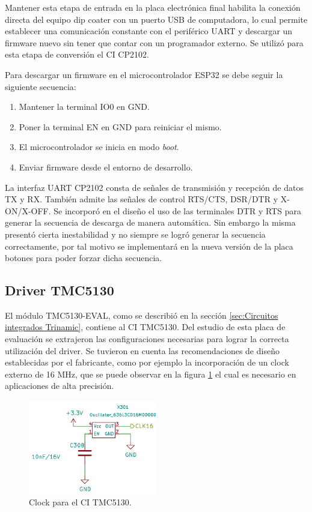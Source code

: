 Mantener esta etapa de entrada en la placa electrónica final habilita la conexión directa del equipo dip coater con un puerto USB de computadora, lo cual permite establecer una comunicación constante con el periférico UART y descargar un firmware nuevo sin tener que contar con un programador externo. Se utilizó para esta etapa de conversión el CI CP2102.

Para descargar un firmware en el microcontrolador ESP32 se debe seguir la siguiente secuencia:
\begin{enumerate}
\item Mantener la terminal IO0 en GND.
\item Poner la terminal EN en GND para reiniciar el mismo.
\item El microcontrolador se inicia en modo \textit{boot}.
\item Enviar firmware desde el entorno de desarrollo. 
\end{enumerate}

La interfaz UART CP2102 consta de señales de transmisión y recepción de datos TX y RX. También admite las señales de control RTS/CTS, DSR/DTR y X-ON/X-OFF. Se incorporó en el diseño el uso de las terminales DTR y RTS para generar la secuencia de descarga de manera automática. Sin embargo la misma presentó cierta inestabilidad y no siempre se logró generar la secuencia correctamente, por tal motivo se implementará en la nueva versión de la placa botones para poder forzar dicha secuencia.



\subsection{Driver TMC5130}

El módulo TMC5130-EVAL, como se describió en la sección \ref{sec:Circuitos integrados Trinamic}, contiene al CI TMC5130. Del estudio de esta placa de evaluación se extrajeron las configuraciones necesarias para lograr la correcta utilización del driver. Se tuvieron en cuenta las recomendaciones de diseño establecidas por el fabricante, como por ejemplo la incorporación de un clock externo de 16 MHz, que se puede observar en la figura \ref{fig:kicad_clock} el cual es necesario en aplicaciones de alta precisión. 

\begin{figure}[h!]
	\centering
	\includegraphics[width=0.5\textwidth]{./Figures/kicad_clock.png}
	\caption{Clock para el CI TMC5130.}
	\label{fig:kicad_clock}
\end{figure}



